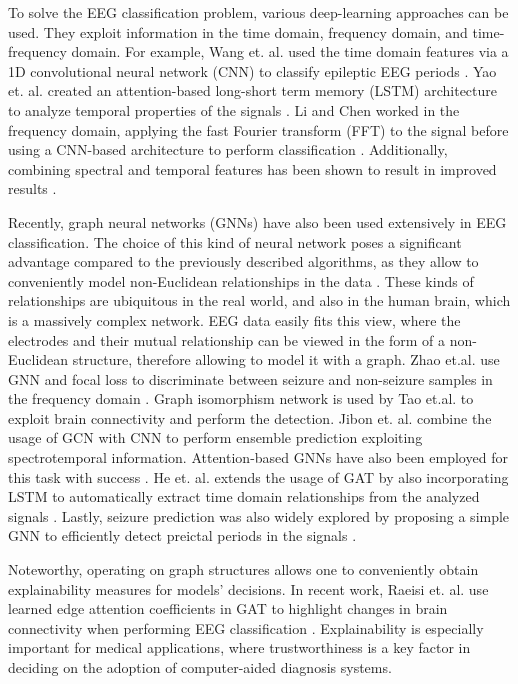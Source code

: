\documentclass[a4paper,fleqn]{cas-sc}
\begin{document}
To solve the EEG classification problem, various deep-learning approaches can be used. They exploit information in the time domain, frequency domain, and time-frequency domain. For example, Wang et. al. used the time domain features via a 1D convolutional neural network (CNN) to classify epileptic EEG periods \cite{Wang1DCNNPrediction}. Yao et. al. created an attention-based long-short term memory (LSTM) architecture to analyze temporal properties of the signals \cite{YaoBiLSTM}. Li and Chen worked in the frequency domain, applying the fast Fourier transform (FFT) to the signal before using a CNN-based architecture to perform classification \cite{LiChenFFTCNN}. Additionally, combining spectral and temporal features has been shown to result in improved results \cite{AssaliTemporalSpectralCNN, GaoWaveletCnnClassification}.

Recently, graph neural networks (GNNs) have also been used extensively in EEG classification. The choice of this kind of neural network poses a significant advantage compared to the previously described algorithms, as they allow to conveniently model non-Euclidean relationships in the data \cite{BronsteinGeometricDL}. These kinds of relationships are ubiquitous in the real world, and also in the human brain, which is a massively complex network. EEG data easily fits this view, where the electrodes and their mutual relationship can be viewed in the form of a non-Euclidean structure, therefore allowing to model it with a graph.
Zhao et.al. use  GNN and focal loss \cite{lin2020focal} to discriminate between seizure and non-seizure samples in the frequency domain \cite{ZhaoGraphFocalLoss}. 
Graph isomorphism network is used by Tao et.al. \cite{tao2022gnnisomorphism} to exploit brain connectivity and perform the detection. Jibon et. al. combine the usage of GCN with CNN to perform ensemble prediction exploiting spectrotemporal information\cite{jibon2023gcndnn}.
Attention-based GNNs have also been employed for this task with success \cite{zhao2021seizuregat}. He et. al. extends 
 the usage of GAT by also incorporating LSTM to automatically extract time domain relationships from the analyzed signals \cite{he2022gatblstm}.
Lastly, seizure prediction was also widely explored by proposing a simple GNN to efficiently detect preictal periods in the signals \cite{JiaEfficientGraphConv}. 

Noteworthy, operating on graph structures allows one to conveniently obtain explainability measures for models' decisions. In recent work, Raeisi et. al. use learned edge attention coefficients in GAT to highlight changes in brain connectivity when performing EEG classification \cite{raeisi2023explainable}. Explainability is especially important for medical applications, where trustworthiness is a key factor in deciding on the adoption of computer-aided diagnosis systems.
\end{document}
